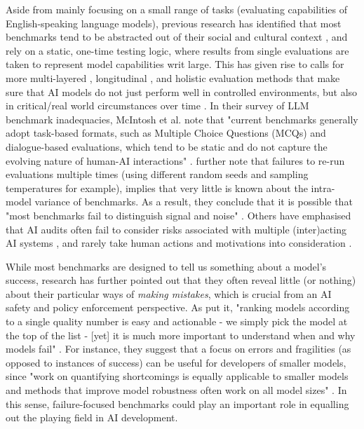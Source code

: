 Aside from mainly focusing on a small range of tasks (evaluating capabilities of English-speaking language models), previous research has identified that most benchmarks tend to be abstracted out of their social and cultural context \cite{selbst2019}, and rely on a static, one-time testing logic, where results from single evaluations are taken to represent model capabilities writ large. This has given rise to calls for more multi-layered \cite{weidinger_sociotechnical_2023}, longitudinal \cite{mizrahi2024}, and holistic evaluation methods that make sure that AI models do not just perform well in controlled environments, but also in critical/real world circumstances over time \cite{ojewale2024, mcintosh2024, chang2023}. In their survey of LLM benchmark inadequacies, McIntosh et al. note that "current benchmarks generally adopt task-based formats, such as Multiple Choice Questions (MCQs) and dialogue-based evaluations, which tend to be static and do not capture the evolving nature of human-AI interactions" \cite[p.~6] {mcintosh2024}. %
\citet{reuel_betterbench_2024} further note that failures to re-run evaluations multiple times (using different random seeds and sampling temperatures for example), implies that very little is known about the intra-model variance of benchmarks. As a result, they conclude that it is possible that "most benchmarks fail to distinguish signal and noise" \cite[p.~9]{reuel_betterbench_2024}. 
Others have emphasised that AI audits often fail to consider risks associated with multiple (inter)acting AI systems \cite{birhane2024}, and rarely take human actions and motivations into consideration \cite{weidinger_sociotechnical_2023, chang2023, rauh2024}. %

While most benchmarks are designed to tell us something about a model's success, research has further pointed out that they often reveal little (or nothing) about their particular ways of \textit{making mistakes}, which is crucial from an AI safety and policy enforcement perspective. As \citet{gehrmann2023} put it, "ranking models according to a single quality number is easy and actionable - we simply pick the model at the top of the list - [yet] it is much more important to understand when and why models fail" \cite[p.~130]{gehrmann2023}.
For instance, they suggest that a focus on errors and fragilities (as opposed to instances of success) can be useful for developers of smaller models, since "work on quantifying shortcomings is equally applicable to smaller models and methods that improve model robustness often work on all model sizes" \cite[p.~131]{gehrmann2023}.
In this sense, failure-focused benchmarks could play an important role in equalling out the playing field in AI development.


